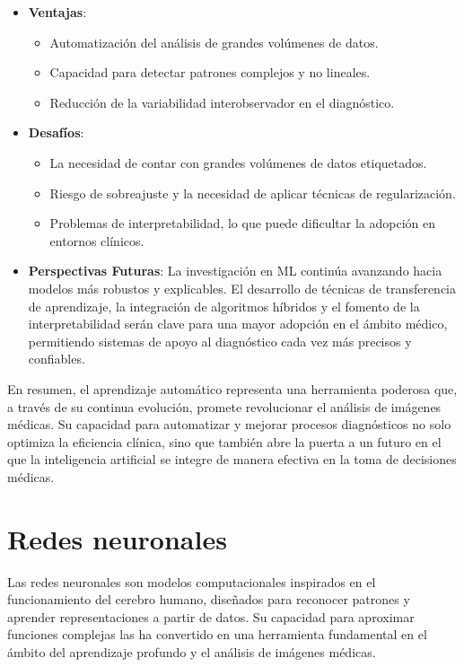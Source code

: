 \documentclass[11pt,spanish,listoffigures,listoftables]{tfgetsinf}
\begin{document}
\begin{itemize}
    \item \textbf{Ventajas}:
    \begin{itemize}
        \item Automatización del análisis de grandes volúmenes de datos.
        \item Capacidad para detectar patrones complejos y no lineales.
        \item Reducción de la variabilidad interobservador en el diagnóstico.
    \end{itemize}
    
    \item \textbf{Desafíos}:
    \begin{itemize}
        \item La necesidad de contar con grandes volúmenes de datos etiquetados.
        \item Riesgo de sobreajuste y la necesidad de aplicar técnicas de regularización.
        \item Problemas de interpretabilidad, lo que puede dificultar la adopción en entornos clínicos.
    \end{itemize}
    
    \item \textbf{Perspectivas Futuras}:
    La investigación en ML continúa avanzando hacia modelos más robustos y explicables. El desarrollo de técnicas de transferencia de aprendizaje, la integración de algoritmos híbridos y el fomento de la interpretabilidad serán clave para una mayor adopción en el ámbito médico, permitiendo sistemas de apoyo al diagnóstico cada vez más precisos y confiables.
\end{itemize}

En resumen, el aprendizaje automático representa una herramienta poderosa que, a través de su continua evolución, promete revolucionar el análisis de imágenes médicas. Su capacidad para automatizar y mejorar procesos diagnósticos no solo optimiza la eficiencia clínica, sino que también abre la puerta a un futuro en el que la inteligencia artificial se integre de manera efectiva en la toma de decisiones médicas.


\section{Redes neuronales}
Las redes neuronales son modelos computacionales inspirados en el funcionamiento del cerebro humano, diseñados para reconocer patrones y aprender representaciones a partir de datos. Su capacidad para aproximar funciones complejas las ha convertido en una herramienta fundamental en el ámbito del aprendizaje profundo y el análisis de imágenes médicas.
\end{document}
